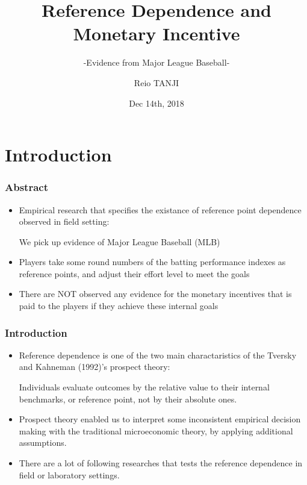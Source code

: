 \documentclass[dvipdfmx,12pt]{beamer}
\title{Reference Dependence and Monetary Incentive}
\subtitle{-Evidence from Major League Baseball-}
\author{Reio TANJI}
\date{Dec 14th, 2018}
\institute{Osaka University}
\begin{document}
\begin{frame}\frametitle{}
\titlepage
\end{frame}

\section{Introduction}
\begin{frame}\frametitle{Abstract}
  \begin{itemize}
    \item Empirical research that specifies the existance of reference point dependence observed in field setting:

    We pick up evidence of Major League Baseball (MLB)

    \item Players take some round numbers of the batting performance indexes as reference points, and adjust their effort level to meet the goals

    \item There are NOT observed any evidence for the monetary incentives that is paid to the players if they achieve these internal goals
  \end{itemize}
\end{frame}

\begin{frame}\frametitle{Introduction}
  \begin{itemize}
    \item Reference dependence is one of the two main charactaristics of the Tversky and Kahneman (1992)'s prospect theory:

    Individuals evaluate outcomes by the relative value to their internal benchmarks, or reference point, not by their absolute ones.

    \item Prospect theory enabled us to interpret some inconsistent empirical decision making with the traditional microeconomic theory, by applying additional assumptions.

    \item There are a lot of following researches that tests the reference dependence in field or laboratory settings.
  \end{itemize}
\end{frame}
\end{document}
